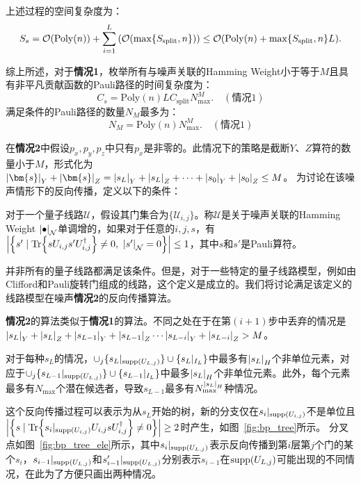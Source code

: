 上述过程的空间复杂度为：
\begin{equation}\label{ap:eq:space_cost}
    S_s=\order{\mathrm{Poly}(n)}+\sum_{i=1}^{L}\left(\order{\max\{S_{\text{split}},n\}}\right)\leq\order{\mathrm{Poly}(n)+\max\{S_{\text{split}},n\}L}.
\end{equation}

综上所述，对于\textbf{情况1}，枚举所有与噪声关联的Hamming Weight小于等于$M$且具有非平凡贡献函数的Pauli路径的时间复杂度为：
\begin{equation}\label{eq:case1:cost_s}
        C_s=\mathrm{Poly}(n) L C_{\text{split}} N_{\text{max}}^{M}. \quad (\text{情况1})
\end{equation}
满足条件的Pauli路径的数量$N_M$最多为：
\begin{equation}\label{eq:case1:N_M}
    N_M=\mathrm{Poly}(n) N_{\text{max}}^{M}. \quad (\text{情况1})
\end{equation}


在\textbf{情况2}中假设${p_x,p_y,p_z}$中只有$p_x$是非零的。此情况下的策略是截断$Y$、$Z$算符的数量小于$M$，形式化为$\abs{\bm{s}}_Y+\abs{\bm{s}}_Z=\abs{s_L}_Y+\abs{s_L}_Z+\cdots+\abs{s_0}_Y+\abs{s_0}_Z\leq M$。
为讨论在该噪声情形下的反向传播，定义以下的条件：
\begin{definition}
    对于一个量子线路$\mathcal{U}$，假设其门集合为$\{\mathcal{U}_{i,j}\}$。称$\mathcal{U}$是关于噪声关联的Hamming Weight $\abs{\bullet}_{\mathcal{N}}$单调增的，如果对于任意的$i,j,s$，有$\abs{\left\{s'\mid \Tr{sU_{i,j}s' U_{i,j}^\dagger}\neq 0,\ \abs{s'}_{\mathcal{N}}=0\right\}}\leq 1$，其中$s$和$s'$是Pauli算符。
\end{definition}
并非所有的量子线路都满足该条件。但是，对于一些特定的量子线路模型，例如由Clifford和Pauli旋转门组成的线路，这个定义是成立的。我们将讨论满足该定义的线路模型在噪声\textbf{情况2}的反向传播算法。

\textbf{情况2}的算法类似于\textbf{情况1}的算法。不同之处在于在第$(i+1)$步中丢弃的情况是$\abs{s_{L}}_Y+\abs{s_{L}}_Z+\abs{s_{L-1}}_Y+\abs{s_{L-1}}_Z \cdots \abs{s_{L-i}}_Y+\abs{s_{L-i}}_Z > M$。

对于每种$s_L$的情况，$\cup_j\{s_L|_{\text{supp}(U_{L,j})}\} \cup \{s_L|_{I_L}\}$中最多有$\abs{s_L}_H$个非单位元素，对应于$\cup_j\{s_{L-1}|_{\text{supp}(U_{L,j})}\}\cup \{s_{L-1}|_{I_L}\}$中最多$\abs{s_L}_H$个非单位元素。此外，每个元素最多有$N_{\text{max}}$个潜在候选者，导致$s_{L-1}$最多有$N_{\text{max}}^{\abs{s_L}_H}$种情况。

这个反向传播过程可以表示为从$s_L$开始的树，新的分支仅在$s_{i}|_{\text{supp}(U_{i,j})}$不是单位且$\abs{\left\{s\mid \Tr{s_{i}|_{\text{supp}(U_{i,j})}U_{i,j}s U_{i,j}^\dagger}\neq 0\right\}} \geq 2$时产生，如图~\ref{fig:bp_tree}所示。
分叉点如图~\ref{fig:bp_tree_ele}所示，其中$s_i|_{\text{supp}(U_{L,j})}$表示反向传播到第$i$层第$j$个门的某个$s_i$，$s_{i-1}|_{\text{supp}(U_{L,j})}$和$s'_{i-1}|_{\text{supp}(U_{L,j})}$分别表示$s_{i-1}$在${\text{supp}(U_{L,j})}$可能出现的不同情况，在此为了方便只画出两种情况。

